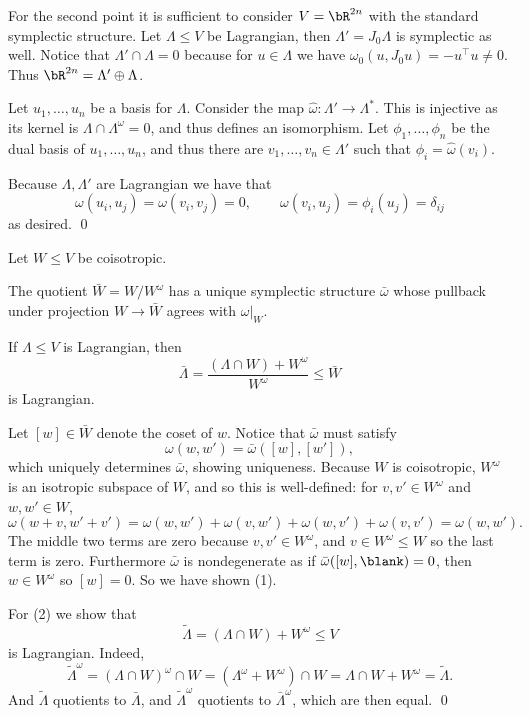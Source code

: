     For the second point it is sufficient to consider $V=\bR^{2n}$ with the standard symplectic structure.
    Let $\Lambda\leq V$ be Lagrangian, then $\Lambda'=J_0\Lambda$ is symplectic as well.
    Notice that $\Lambda'\cap\Lambda=0$ because for $u\in\Lambda$ we have $\omega_0(u,J_0u)=-u^\top u\neq0$.
    Thus $\bR^{2n}=\Lambda'\oplus\Lambda$.

    Let $u_1,\dots,u_n$ be a basis for $\Lambda$.
    Consider the map $\hat\omega\colon \Lambda'\to\Lambda^*$.
    This is injective as its kernel is $\Lambda\cap\Lambda^\omega=0$, and thus defines an isomorphism.
    Let $\phi_1,\dots,\phi_n$ be the dual basis of $u_1,\dots,u_n$, and thus there are $v_1,\dots,v_n\in\Lambda'$ such that $\phi_i=\hat\omega(v_i)$.

    Because $\Lambda,\Lambda'$ are Lagrangian we have that
    $$ \omega(u_i,u_j) = \omega(v_i,v_j) = 0,\qquad \omega(v_i,u_j) = \phi_i(u_j) = \delta_{ij} $$
    as desired.
    \qed

\eproof

\bprop

    Let $W\leq V$ be coisotropic.
    \benum
        \item The quotient $\bar W=W/W^\omega$ has a unique symplectic structure $\bar\omega$ whose pullback under projection $W\to\bar W$ agrees with $\omega|_W$.
        \item If $\Lambda\leq V$ is Lagrangian, then
        $$ \bar\Lambda = \frac{(\Lambda\cap W)+W^\omega}{W^\omega} \leq \bar W $$
        is Lagrangian.
    \eenum

\eprop

\bproof

    Let $[w]\in\bar W$ denote the coset of $w$.
    Notice that $\bar\omega$ must satisfy
    $$ \omega(w,w') = \bar\omega([w],[w']) , $$
    which uniquely determines $\bar\omega$, showing uniqueness.
    Because $W$ is coisotropic, $W^\omega$ is an isotropic subspace of $W$, and so this is well-defined: for $v,v'\in W^\omega$ and $w,w'\in W$,
    $$ \omega(w+v,w'+v') = \omega(w,w') + \omega(v,w') + \omega(w,v') + \omega(v,v') = \omega(w,w') . $$
    The middle two terms are zero because $v,v'\in W^\omega$, and $v\in W^\omega\leq W$ so the last term is zero.
    Furthermore $\bar\omega$ is nondegenerate as if $\bar\omega([w],\blank)=0$, then $w\in W^\omega$ so $[w]=0$.
    So we have shown (1).

    For (2) we show that
    $$ \tilde\Lambda = (\Lambda\cap W) + W^\omega \leq V $$
    is Lagrangian.
    Indeed,
    $$ \tilde\Lambda^\omega = (\Lambda\cap W)^\omega\cap W = (\Lambda^\omega + W^\omega)\cap W = \Lambda\cap W + W^\omega = \tilde\Lambda . $$
    And $\tilde\Lambda$ quotients to $\bar\Lambda$, and $\tilde\Lambda^\omega$ quotients to $\bar\Lambda^\omega$, which are then equal.
    \qed

\eproof


